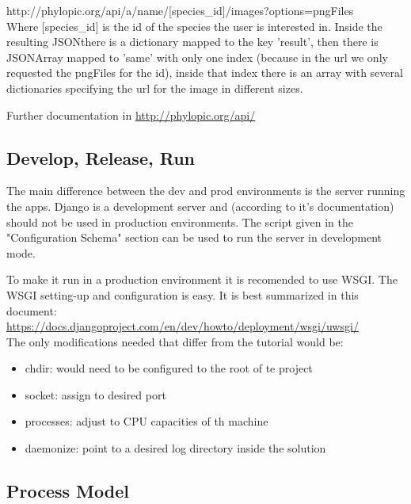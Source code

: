 \documentclass[10pt]{article}
\begin{document}
http://phylopic.org/api/a/name/[species\_id]/images?options=pngFiles\\

Where [species\_id] is the id of the species the user is interested in. Inside the resulting JSONthere is a dictionary mapped to the key 'result', then there is JSONArray mapped to 'same' with only one index (because in the url we only requested the pngFiles for the id), inside that index there is an array with several dictionaries specifying the url for the image in different sizes.

Further documentation in \href{http://phylopic.org/api/}{http://phylopic.org/api/}
 
 \subsection{Develop, Release, Run}
 
The main difference between the dev and prod environments is the server running the apps. Django is a development server and (according to it's documentation) should not be used in production environments. The script given in the "Configuration Schema" section can be used to run the server in development mode. 

To make it run in a production environment it is recomended to use WSGI. The WSGI setting-up and configuration is easy. It is best summarized in this document:\\ \href{https://docs.djangoproject.com/en/dev/howto/deployment/wsgi/uwsgi/}{https://docs.djangoproject.com/en/dev/howto/deployment/wsgi/uwsgi/}\\

The only modifications needed that differ from the tutorial would be:

\begin{itemize}
	\item chdir: would need to be configured to the root of te project
	\item socket: assign to desired port
	\item processes: adjust to CPU capacities of th machine
	\item daemonize: point to a desired log directory inside the solution
\end{itemize}
 
 \subsection{Process Model}
 
\end{document}
